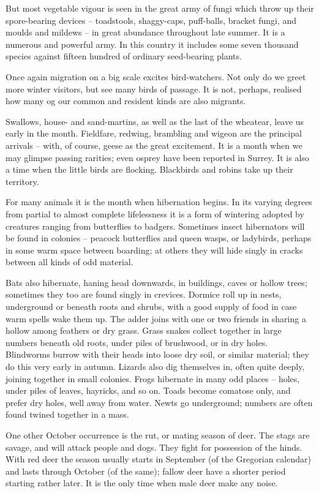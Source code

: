 But most vegetable vigour is seen in the great army of fungi which throw up their spore-bearing devices -- toadstools, shaggy-caps, puff-balls, bracket fungi, and moulds and mildews -- in great abundance throughout late summer. It is a numerous and powerful army. In this country it includes some seven thousand species against fifteen hundred of ordinary seed-bearing plants.

Once again migration on a big scale excites bird-watchers. Not only do we greet more winter visitors, but see many birds of passage. It is not, perhaps, realised how many og our common and resident kinds are also migrants.

Swallows, house- and sand-martins, as well as the last of the wheatear, leave us early in the month. Fieldfare, redwing, brambling and wigeon are the principal arrivals -- with, of course, geese as the great excitement. It is a month when we may glimpse passing rarities; even osprey have been reported in Surrey. It is also a time when the little birds are flocking. Blackbirds and robins take up their territory.

For many animals it is the month when hibernation begins. In its varying degrees from partial to almost complete lifelessness it is a form of wintering adopted by creatures ranging from butterflies to badgers. Sometimes insect hibernators will be found in colonies -- peacock butterflies and queen wasps, or ladybirds, perhaps in some warm space between boarding; at others they will hide singly in cracks between all kinds of odd material.

Bats also hibernate, haning head downwards, in buildings, caves or hollow trees; sometimes they too are found singly in crevices. Dormice roll up in nests, underground or beneath roots and shrubs, with a good supply of food in case warm spells wake them up. The adder joins with one or two friends in sharing a hollow among feathers or dry grass. Grass snakes collect together in large numbers beneath old roots, under piles of brushwood, or in dry holes. Blindworms burrow with their heads into loose dry soil, or similar material; they do this very early in autumn. Lizards also dig themselves in, often quite deeply, joining together in small colonies. Frogs hibernate in many odd places -- holes, under piles of leaves, hayricks, and so on. Toads become comatose only, and prefer dry holes, well away from water. Newts go underground; numbers are often found twined together in a mass.

One other October occurrence is the rut, or mating season of deer. The stags are savage, and will attack people and dogs. They fight for possession of the hinds. With red deer the season usually starts in September (of the Gregorian calendar) and lasts through October (of the same); fallow deer have a shorter period starting rather later. It is the only time when male deer make any noise.
